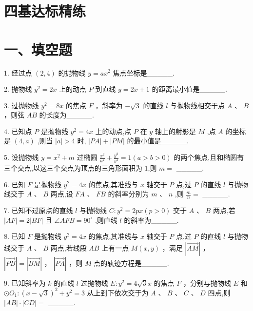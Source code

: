 \section*{四基达标精练}

\section*{一、填空题}

1. 经过点 $\left( {2,4}\right)$ 的抛物线 $y = a{x}^{2}$ 焦点坐标是\_\_\_\_\_.

2. 抛物线 ${y}^{2} = {2x}$ 上的动点 $P$ 到直线 $y = {2x} + 1$ 的距离最小值是\_\_\_\_\_.

3. 过抛物线 ${y}^{2} = {8x}$ 的焦点 $F$ ，斜率为 $- \sqrt{3}$ 的直线 $l$ 与抛物线相交于点 $A$ 、 $B$ ，则弦 ${AB}$ 的长度为\_\_\_\_\_.

4. 已知点 $P$ 是抛物线 ${y}^{2} = {4x}$ 上的动点,点 $P$ 在 $y$ 轴上的射影是 $M$ ,点 $A$ 的坐标是 $\left( {4,a}\right)$ ,则当 $\left| a\right|  > 4$ 时, $\left| {PA}\right|  + \left| {PM}\right|$ 的最小值是\_\_\_\_\_.

5. 设抛物线 $y = {x}^{2} + m$ 过椭圆 $\frac{{x}^{2}}{{a}^{2}} + \frac{{y}^{2}}{{b}^{2}} = 1\left( {a > b > 0}\right)$ 的两个焦点,且和椭圆有三个交点,以这三个交点为顶点的三角形面积为 1,则 $m =$ \_\_\_\_\_.

6. 已知 $F$ 是抛物线 ${y}^{2} = {4x}$ 的焦点,其准线与 $x$ 轴交于 $P$ 点,过 $P$ 的直线 $l$ 与抛物线交于 $A\text{ 、 }B$ 两点,设 ${FA}\text{ 、 }{FB}$ 的斜率分别为 $m\text{ 、 }n$ ,则 $\frac{m}{n} =$ \_\_\_\_\_.

7. 已知不过原点的直线 $l$ 与抛物线 $C : {y}^{2} = {2px}\left( {p > 0}\right)$ 交于 $A\text{ 、 }B$ 两点,若 $\left| {AF}\right|  = 2\left| {BF}\right|$ 且 $\angle {AFB} =  {90}^{ \circ  }$ ,则直线 $l$ 的斜率为\_\_\_\_\_.

8. 已知 $F$ 是抛物线 ${y}^{2} = {4x}$ 的焦点,其准线与 $x$ 轴交于 $P$ 点,过 $P$ 的直线 $l$ 与抛物线交于 $A\text{ 、 }B$ 两点,若线段 ${AB}$ 上有一点 $M\left( {x,y}\right)$ ，满足 $\left| \overrightarrow{AM}\right|$ ， $\left| \overrightarrow{PB}\right|  = \left| \overrightarrow{BM}\right|$ ， $\left| \overrightarrow{PA}\right|$ ，则 $M$ 点的轨迹方程是\_\_\_\_\_.

9. 已知斜率为 $k$ 的直线 $l$ 过抛物线 $E : {y}^{2} = 4\sqrt{3}x$ 的焦点 $F$ ，分别与抛物线 $E$ 和 $\odot  {O}_{1} : {\left( x - \sqrt{3}\right) }^{2} + {y}^{2} = 3$ 从上到下依次交于为 $A\text{ 、 }B\text{ 、 }C\text{ 、 }D$ 四点,则 $\left| {AB}\right|  \cdot  \left| {CD}\right|  =$ \_\_\_\_\_.


